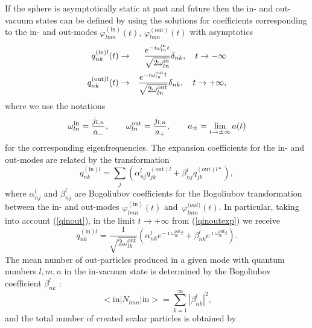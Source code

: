 \documentclass[a4paper,11pt]{article}
\begin{document}
If the sphere is asymptotically static at past and future then the in- and
out- vacuum states can be defined by using the solutions for coefficients
corresponding to the in- and out-modes $\varphi _{lmn}^{\mathrm{(in)}%
}(t),\,\varphi _{lmn}^{\mathrm{(out)}}(t)$ with asymptotics
\begin{eqnarray}
q_{nk}^{{\mathrm{(in)}}l}(t) &\rightarrow &\frac{e^{-\imath \omega _{ln}^{%
{\mathrm{in}}}t}}{\sqrt{2\omega _{ln}^{{\mathrm{in}}}}}\delta _{nk},\quad
t\rightarrow -\infty   \label{qinout} \\
q_{nk}^{{\mathrm{(out)}}l}(t) &\rightarrow &\frac{e^{-\imath \omega _{ln}^{%
{\mathrm{out}}}t}}{\sqrt{2\omega _{ln}^{{\mathrm{out}}}}}\delta _{nk},\quad
t\rightarrow +\infty ,
\end{eqnarray}
where we use the notations
\begin{equation}
\omega _{ln}^{{\mathrm{in}}}=\frac{j_{l,n}}{a_{-}},\qquad \omega _{ln}^{%
{\mathrm{out}}}=\frac{j_{l,n}}{a_{+}},\qquad a_{\pm }=\lim_{t\rightarrow \pm
\infty }a(t)  \label{omegalf}
\end{equation}
for the corresponding eigenfrequencies. The expansion coefficients for the
in- and out-modes are related by the transformation \cite{set}
\begin{equation}
q_{nk}^{{\mathrm{(in)}}l}=\sum_{j}\left( \alpha _{nj}^{l}
q_{jk}^{{\mathrm{(out)}}%
l}+\beta _{nj}^{l}q_{jk}^{{\mathrm{(out)}}l\ast }\right) ,  \label{qinoutexp}
\end{equation}
where $\alpha _{nj}^{l}$ and $\beta _{nj}^{l}$ are Bogoliubov coefficients
for the Bogoliubov transformation between the in- and out-modes $\varphi
_{lmn}^{{\mathrm{(in)}}}(t)$ and $\,\varphi _{lmn}^{{\mathrm (out)}}(t)$. In
particular, taking into account (\ref{qinout}), in the limit $t\rightarrow
+\infty $ from (\ref{qinoutexp}) we receive
\begin{equation}
q_{nk}^{{\mathrm{(in)}}l}=\frac{1}{\sqrt{2\omega _{lk}^{{\mathrm{out}}}}}
\left(
\alpha _{nk}^{l}e^{-\imath \omega _{lk}^{{\mathrm{out}}}t}+\beta
_{nk}^{l}e^{\imath \omega _{lk}^{{\mathrm{out}}}t}\right) .  \label{qinoutas}
\end{equation}
The mean number of out-particles produced in a given mode with
quantum numbers $l,m,n$ in the
in-vacuum state is determined by the Bogoliubov coefficient $\beta _{nk}^{l}$%
:
\begin{equation}
<{\mathrm{in}}|N_{lmn}|{\mathrm{in}}>=\sum_{k=1}^{\infty }|
\beta _{nk}^{l}|^{2},
\label{Nlmn}
\end{equation}
and the total number of created scalar particles is obtained by
\end{document}
